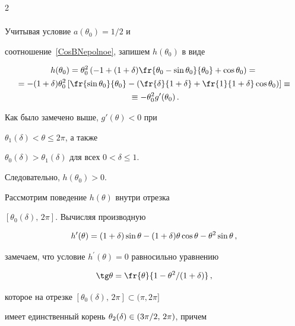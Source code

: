\begin{multicols}{2}
\begin{gather*}
\end{gather*}

Учитывая условие $a(\theta_0)=1/2$ и

соотношение~\eqref{CosBNepolnoe}, запишем $h(\theta_0)$ в виде

\begin{multline*}

h(\theta_0)=

\theta_0^2\left(

-1+(1+\d)\fr{\theta_0-\sin\theta_0}{\theta_0}+

\cos\theta_0\right)={}\\

{}=

-(1+\d)\theta_0^2\left[\fr{\sin\theta_0}{\theta_0}-

\left(\fr{\d}{1+\d}+\fr{1}{1+\d}\cos\theta_0\right)\right]\equiv{}\\

{}\equiv -\theta_0^2

g^\prime(\theta_0)\,.

\end{multline*}

Как было замечено выше, $g'(\theta)<0$ при

${\theta_1(\delta)<\theta\le2\pi}$, а также

$\theta_0(\delta)>\theta_1(\delta)$ для всех $0<\delta\le 1$.

Следовательно, $h(\theta_0)>0$.



Рассмотрим поведение $h(\theta)$ внутри отрезка

$[\theta_0(\delta),\,2\pi]$. Вычисляя производную

\begin{equation*}

h^\prime(\theta)=

(1+\d)\sin\theta-(1+\d)\theta\cos\theta-\theta^2\sin\theta\,,

\end{equation*}

замечаем, что условие $h^\prime(\theta)=0$ равносильно уравнению

$$

\tg \theta=\fr{\theta}{1-\theta^2/(1+\d)}\,,

$$

которое на отрезке $[\theta_0(\delta),\,2\pi]\subset(\pi,2\pi]$

имеет единственный корень ${\theta_2(\delta)\in(3\pi/2,\,2\pi)}$, причем


\end{multicols}
